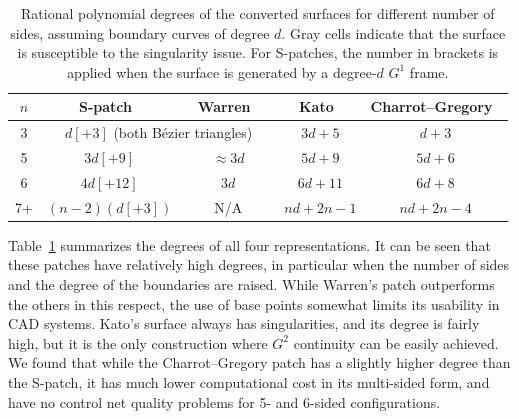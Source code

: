 \documentclass{article}
\begin{document}

\begin{table}[h!]
  \centering
  \begin{tabular}{c|c|c|c|c}
    $n$ & S-patch~\cite{spatch1} & Warren~\cite{warren} & Kato~\cite{kato} & Charrot--Gregory~\cite{charrot} \\ \hline
    3 & \multicolumn{2}{c|}{$d[+3]$ (both B\'ezier triangles)} & \cellcolor{light-gray}$3d+5$ & $d+3$ \\ \hline
    5 & \cellcolor{light-light-gray}$3d[+9]$ & $\approx 3d$ & \cellcolor{light-gray}$5d+9$ & $5d+6$ \\ \hline
    6 & \cellcolor{light-light-gray}$4d[+12]$ & $3d$ & \cellcolor{light-gray}$6d+11$ & $6d+8$ \\ \hline
    7+ & \cellcolor{light-gray}$(n-2)(d[+3])$ & $\qquad$N/A$\qquad$ & \cellcolor{light-gray}$nd+2n-1$ & \cellcolor{light-gray}$nd+2n-4$ \\ \hline
  \end{tabular}
  \caption{Rational polynomial degrees of the converted surfaces for different number of sides,
    assuming boundary curves of degree $d$. Gray cells indicate that the surface is susceptible to
    the singularity issue.
    For S-patches, the number in brackets is applied
    when the surface is generated by a degree-$d$ $G^1$ frame.}
  \label{tab:degrees}
\end{table}

Table~\ref{tab:degrees} summarizes the degrees of all four representations.
It can be seen that these patches
have relatively high degrees, in particular when the number of sides and the degree of the
boundaries are raised. While Warren's patch outperforms the others in this respect,
the use of base points somewhat limits its usability in CAD systems.
Kato's surface always has singularities, and its degree is fairly high, but it is the only
construction where $G^2$ continuity can be easily achieved. We found that while the
Charrot--Gregory patch has a slightly higher degree than the S-patch, it has much lower
computational cost in its multi-sided form, and have no control net quality problems for 5-
and 6-sided configurations.
\end{document}
